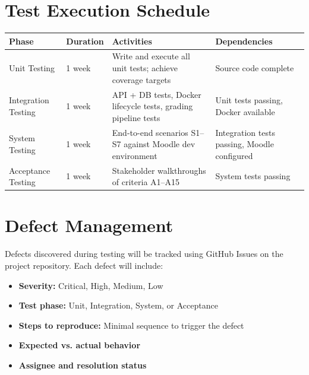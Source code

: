 \documentclass[12pt, letterpaper]{article}
\begin{document}
\section{Test Execution Schedule}

\begin{longtable}{p{3cm} p{3cm} p{4cm} p{3.5cm}}
    \toprule
    \textbf{Phase} & \textbf{Duration} & \textbf{Activities} & \textbf{Dependencies} \\
    \midrule
    Unit Testing & 1 week & Write and execute all unit tests; achieve coverage targets & Source code complete \\
    Integration Testing & 1 week & API + DB tests, Docker lifecycle tests, grading pipeline tests & Unit tests passing, Docker available \\
    System Testing & 1 week & End-to-end scenarios S1--S7 against Moodle dev environment & Integration tests passing, Moodle configured \\
    Acceptance Testing & 1 week & Stakeholder walkthroughs of criteria A1--A15 & System tests passing \\
    \bottomrule
\end{longtable}

\section{Defect Management}

Defects discovered during testing will be tracked using GitHub Issues on the project repository. Each defect will include:

\begin{itemize}
    \item \textbf{Severity:} Critical, High, Medium, Low
    \item \textbf{Test phase:} Unit, Integration, System, or Acceptance
    \item \textbf{Steps to reproduce:} Minimal sequence to trigger the defect
    \item \textbf{Expected vs. actual behavior}
    \item \textbf{Assignee and resolution status}
\end{itemize}
\end{document}
